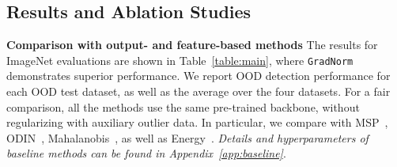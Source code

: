\documentclass{article}
\begin{document}
\subsection{Results and Ablation Studies}
\label{sec:ablations}
\vspace{-0.2cm}
\textbf{Comparison with output- and feature-based methods} 
The results for ImageNet evaluations are shown in Table~\ref{table:main}, where \texttt{GradNorm} demonstrates  superior performance. We report OOD detection performance for each OOD test dataset, as well as the average over the four datasets. For a fair comparison, all the methods use the same pre-trained backbone, without regularizing with auxiliary outlier data. 
In particular, we compare with MSP~\cite{hendrycks2016baseline}, ODIN~\cite{liang2018enhancing}, Mahalanobis~\cite{lee2018simple}, as well as Energy~\cite{liu2020energy}.
\emph{Details and hyperparameters of baseline methods can be found in Appendix~\ref{app:baseline}}. %
\end{document}
